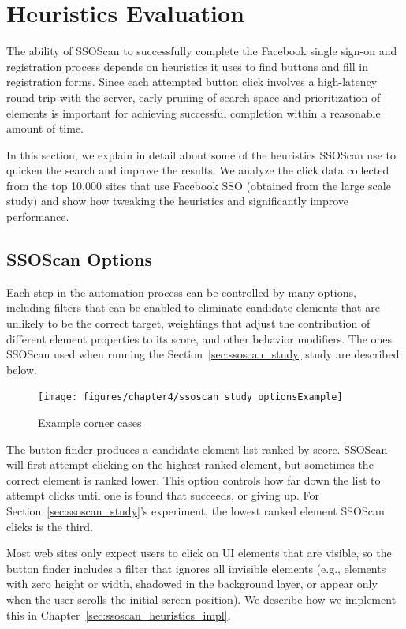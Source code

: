 \section{Heuristics Evaluation}
\label{sec:ssoscan_heuristics}

The ability of SSOScan to successfully complete the Facebook single sign-on and registration process depends on heuristics it uses to find buttons and fill in registration forms.  Since each attempted button click involves a high-latency round-trip with the server, early pruning of search space and prioritization of elements is important for achieving successful completion within a reasonable amount of time.

In this section, we explain in detail about some of the heuristics SSOScan use to quicken the search and improve the results.  We analyze the click data collected from the top 10,000 sites that use Facebook SSO (obtained from the large scale study) and show how tweaking the heuristics and significantly improve performance.

\subsection{SSOScan Options}
\label{sec:ssoscan_heuristics_options}

Each step in the automation process can be controlled by many options, including filters that can be enabled to eliminate candidate elements that are unlikely to be the correct target, weightings that adjust the contribution of different element properties to its score, and other behavior modifiers.  The ones SSOScan used when running the Section~\ref{sec:ssoscan_study} study are described below.

\begin{figure}[hbt]
\centering
\texttt{[image: figures/chapter4/ssoscan\_study\_optionsExample]}
\caption{Example corner cases}
\label{fig:ssoscan_study_optionsExample}
\end{figure}

 The button finder produces a candidate element list ranked by score.  SSOScan will first attempt clicking on the highest-ranked element, but sometimes the correct element is ranked lower.  This option controls how far down the list to attempt clicks until one is found that succeeds, or giving up.  For Section~\ref{sec:ssoscan_study}'s experiment, the lowest ranked element SSOScan clicks is the third.

 Most web sites only expect users to click on UI elements that are visible, so the button finder includes a filter that ignores all invisible elements (e.g., elements with zero height or width, shadowed in the background layer, or appear only when the user scrolls the initial screen position).  We describe how we implement this in Chapter~\ref{sec:ssoscan_heuristics_impl}.  %

